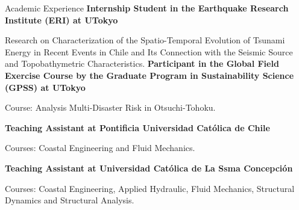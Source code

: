\begin{rubric}{Academic Experience}
\entry*[2017 -- 2018]%
	\textbf{Internship Student in the Earthquake Research Institute (ERI) at UTokyo} 
	\par Research on Characterization of the Spatio-Temporal Evolution of Tsunami Energy in Recent Events in Chile and Its Connection with the Seismic Source and Topobathymetric Characteristics.
%
%
\entry*[2017]%
	\textbf{Participant in the Global Field Exercise Course by the Graduate Program in Sustainability Science (GPSS) at UTokyo} 
	\par Course: Analysis Multi-Disaster Risk in Otsuchi-Tohoku.

\entry*[2015 - 2019]%
	\textbf{Teaching Assistant at Pontificia Universidad Cat\'olica de Chile} 
	\par Courses: Coastal Engineering and Fluid Mechanics.
	 
\entry*[2011 - 2013]%
	\textbf{Teaching Assistant at Universidad Cat\'olica de La Ssma Concepci\'on} 
	\par Courses: Coastal Engineering, Applied Hydraulic, Fluid Mechanics, Structural Dynamics and Structural Analysis.
\end{rubric}

    

